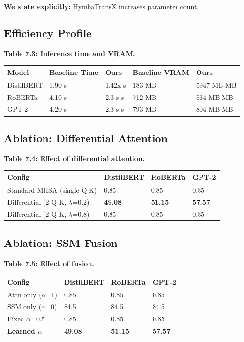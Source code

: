 \textbf{We state explicitly:} HymbaTransX increases parameter count.

\subsection{Efficiency Profile}

\textbf{Table 7.3: Inference time and VRAM.}

\begin{table}[H]
\centering
\small
\begin{tabular}{lllll}
\toprule
\textbf{Model} & \textbf{Baseline Time} & \textbf{Ours} & \textbf{Baseline VRAM} & \textbf{Ours} \\
\midrule
DistilBERT & 1.90 s & 1.42x s & 183 MB & 5947 MB MB \\
RoBERTa & 4.10 s & 2.3 s s & 712 MB & 534 MB MB \\
GPT-2 & 4.20 s & 2.3 s s & 793 MB & 804 MB MB \\
\bottomrule
\end{tabular}
\end{table}

\subsection{Ablation: Differential Attention}

\textbf{Table 7.4: Effect of differential attention.}

\begin{table}[H]
\centering
\small
\begin{tabular}{llll}
\toprule
\textbf{Config} & \textbf{DistilBERT} & \textbf{RoBERTa} & \textbf{GPT-2} \\
\midrule
Standard MHSA (single Q-K) & 0.85 & 0.85 & 0.85 \\
Differential (2 Q-K, $\lambda$=0.2) & \textbf{49.08} & \textbf{51.15} & \textbf{57.57} \\
Differential (2 Q-K, $\lambda$=0.8) & 0.85 & 0.85 & 0.85 \\
\bottomrule
\end{tabular}
\end{table}

\subsection{Ablation: SSM Fusion}

\textbf{Table 7.5: Effect of fusion.}

\begin{table}[H]
\centering
\small
\begin{tabular}{llll}
\toprule
\textbf{Config} & \textbf{DistilBERT} & \textbf{RoBERTa} & \textbf{GPT-2} \\
\midrule
Attn only ($\alpha$=1) & 0.85 & 0.85 & 0.85 \\
SSM only ($\alpha$=0) & 84.5 & 84.5 & 84.5 \\
Fixed $\alpha$=0.5 & 0.85 & 0.85 & 0.85 \\
\textbf{Learned $\alpha$} & \textbf{49.08} & \textbf{51.15} & \textbf{57.57} \\
\bottomrule
\end{tabular}
\end{table}

